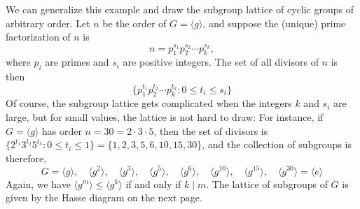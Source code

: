 \documentclass[12pt]{article}
\newcommand{\divides}{\ensuremath{\mid}}
\newcommand{\<}{\ensuremath{\langle}}
\renewcommand{\>}{\ensuremath{\rangle}}
\newcommand{\eye}{\ensuremath{e}}
\theoremstyle{plain}
\theoremstyle{definition}
\begin{document}
We can generalize this example and draw the subgroup lattice of cyclic groups of
arbitrary order. 
Let $n$ be the order of $G = \<g\>$, and suppose the (unique) prime
factorization of $n$ is
\[
n = p_1^{s_1} p_2^{s_2} \cdots p_k^{s_k},
\]
where $p_i$ are primes and $s_i$ are positive integers.  The
set of all divisors of $n$ is then
\[
\{p_1^{t_1} p_2^{t_2} \cdots p_k^{t_k} : 0\leq t_i \leq s_i\}
\]
Of course, the subgroup lattice gets complicated when the integers $k$ and $s_i$
are large, but for small values, the lattice is not hard to draw:
For instance, if $G = \<g \>$ has order $n = 30 = 2 \cdot 3 \cdot 5$, then
the set of divisors is 
$\{2^{t_1} 3^{t_2} 5^{t_3} : 0\leq t_i \leq 1\} = \{1, 2, 3, 5, 6, 10, 15, 30\}$,
and the collection of subgroups is therefore,
\[
G =\<g\>,\quad 
\< g^2\>, \quad
\< g^3\>, \quad
\< g^5\>, \quad
\< g^{6}\>, \quad
\< g^{10}\>, \quad
\< g^{15}\>, \quad
\< g^{30}\> = \<\eye\>
\]
Again, we have $\<g^m\> \leq \< g^k\>$ if and only if $k\divides m$.
The lattice of subgroups of $G$ is given by the Hasse diagram on the next page.
\begin{center}
\end{center}
\end{document}
